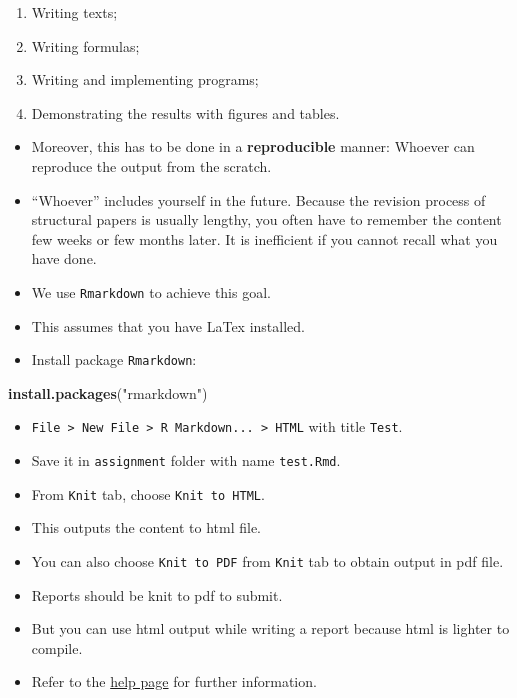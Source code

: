 \documentclass[]{book}
\newenvironment{Shaded}{\begin{snugshade}}{\end{snugshade}}
\newcommand{\KeywordTok}[1]{\textcolor[rgb]{0.13,0.29,0.53}{\textbf{#1}}}
\newcommand{\StringTok}[1]{\textcolor[rgb]{0.31,0.60,0.02}{#1}}
\newcommand{\NormalTok}[1]{#1}
\providecommand{\tightlist}{%
  \setlength{\itemsep}{0pt}\setlength{\parskip}{0pt}}
\theoremstyle{definition}
\theoremstyle{definition}
\theoremstyle{definition}
\theoremstyle{remark}
\begin{document}
\begin{enumerate}
\def\labelenumi{\arabic{enumi}.}
\tightlist
\item
  Writing texts;
\item
  Writing formulas;
\item
  Writing and implementing programs;
\item
  Demonstrating the results with figures and tables.
\end{enumerate}

\begin{itemize}
\item
  Moreover, this has to be done in a \textbf{reproducible} manner:
  Whoever can reproduce the output from the scratch.
\item
  ``Whoever'' includes yourself in the future. Because the revision
  process of structural papers is usually lengthy, you often have to
  remember the content few weeks or few months later. It is inefficient
  if you cannot recall what you have done.
\item
  We use \texttt{Rmarkdown} to achieve this goal.
\item
  This assumes that you have LaTex installed.
\item
  Install package \texttt{Rmarkdown}:
\end{itemize}

\begin{Shaded}
\begin{Highlighting}[]
\KeywordTok{install.packages}\NormalTok{(}\StringTok{"rmarkdown"}\NormalTok{)}
\end{Highlighting}
\end{Shaded}

\begin{itemize}
\tightlist
\item
  \texttt{File\ \textgreater{}\ New\ File\ \textgreater{}\ R\ Markdown...\ \textgreater{}\ HTML}
  with title \texttt{Test}.
\item
  Save it in \texttt{assignment} folder with name \texttt{test.Rmd}.
\item
  From \texttt{Knit} tab, choose \texttt{Knit\ to\ HTML}.
\item
  This outputs the content to html file.
\item
  You can also choose \texttt{Knit\ to\ PDF} from \texttt{Knit} tab to
  obtain output in pdf file.
\item
  Reports should be knit to pdf to submit.
\item
  But you can use html output while writing a report because html is
  lighter to compile.
\item
  Refer to the \href{https://rmarkdown.rstudio.com/lesson-1.html}{help
  page} for further information.
\end{itemize}
\end{document}
